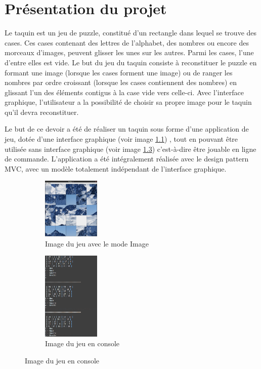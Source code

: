 \chapter{Présentation du projet}

		Le taquin est un jeu de puzzle, constitué d’un rectangle dans lequel se trouve des cases. Ces cases contenant des lettres de l'alphabet, des nombres ou encore des morceaux d’images, peuvent glisser les unes sur les autres. Parmi les cases, l’une d'entre elles est vide.
		Le but du jeu du taquin consiste à reconstituer le puzzle en formant une image (lorsque les cases forment une image) ou de ranger les nombres par ordre croissant (lorsque les cases contiennent des nombres) en glissant l'un des éléments contigus à la case vide vers celle-ci. Avec l’interface graphique, l'utilisateur a la possibilité de choisir sa propre image pour le taquin qu’il devra reconstituer.

		Le but de ce devoir a été de réaliser un taquin sous forme d’une application de jeu, dotée d'une interface graphique (voir image \ref{fig:JeuImage}) , tout en pouvant être utilisée sans interface graphique (voir image \ref{fig:JeuConsole}) c'est-à-dire être jouable en ligne de commande. L'application a été intégralement réalisée avec le design pattern MVC, avec un modèle totalement indépendant de l'interface graphique.

		\begin{figure}[H]
			\begin{subfigure}[t]{0.5\textwidth}
				\centering\includegraphics[width=0.30\textwidth, keepaspectratio]{img/jeuImage.png}
				\caption{Image du jeu avec le mode Image}
				\label{fig:JeuImage}
			\end{subfigure}%
			\begin{subfigure}[t]{0.5\textwidth}
				\centering\includegraphics[width=0.30\textwidth, keepaspectratio]{img/jeuConsole.png}
				\caption{Image du jeu en console}
				\label{fig:JeuConsole}
			\end{subfigure}
		\end{figure}
